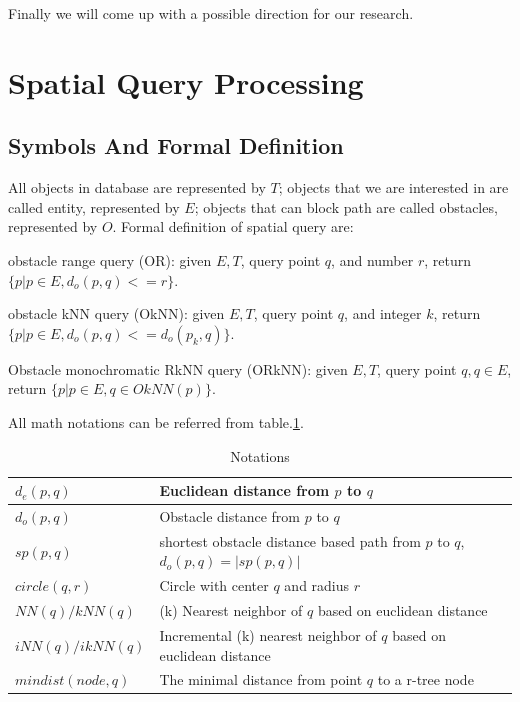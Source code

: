 Finally we will come up with a possible direction for our research.

\section{Spatial Query Processing}\label{lrsqp}

\subsection{Symbols And Formal Definition}\label{background}

All objects in database are represented by $T$; objects that we are interested in are
called entity, represented by $E$; objects that can block path are called obstacles,
represented by $O$. Formal definition of spatial query are:

\begin{definition}{obstacle range query (OR):}
given $E,T$, query point $q$,  and number $r$, 
  return $\{p | p \in E, d_o(p, q) <= r\}$.
\end{definition}

\begin{definition}{obstacle kNN query (OkNN):}
given $E,T$, query point $q$, and integer $k$,
  return $\{p | p \in E, d_o(p, q) <= d_o(p_k, q)\}$.
\end{definition}

\begin{definition}{Obstacle monochromatic RkNN query (ORkNN):}
given $E,T$, query point $q, q \in E$,
    return $\{p | p \in E, q \in OkNN(p)\}$.
\end{definition}

All math notations can be referred from table.\ref{notations}.
\begin{table}[ht]
\centering
\caption{Notations}
\begin{tabular}{|l|l|}
\hline
$d_e(p, q)$         & Euclidean distance from $p$ to $q$  \\
\hline
$d_o(p, q)$         & Obstacle distance from $p$ to $q$ \\
\hline
$sp(p, q)$          & shortest obstacle distance based path from $p$ to $q$, $d_o(p, q)=|sp(p,q)|$\\
\hline
$circle(q, r)$      & Circle with center $q$ and radius $r$ \\
\hline
$NN(q) / kNN(q)$    & (k) Nearest neighbor of $q$ based on euclidean distance \\
\hline
$iNN(q) / ikNN(q)$  & Incremental (k) nearest neighbor of $q$ based on euclidean distance \\
\hline
$mindist(node, q)$  & The minimal distance from point $q$ to a r-tree node \\
\hline
\end{tabular}
\label{notations}
\end{table}
